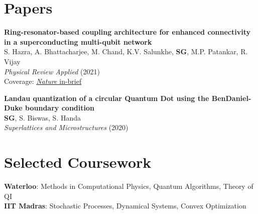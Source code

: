 \documentclass[margin,line]{res}
\begin{document}
\begin{resume}
\section{\sc Papers}
{\bf Ring-resonator-based coupling architecture for enhanced connectivity in a superconducting multi-qubit network} \href{https://journals.aps.org/prapplied/abstract/10.1103/PhysRevApplied.16.024018?ft=1}{\sf[doi]}\\
S. Hazra, A. Bhattacharjee, M. Chand, K.V. Salunkhe, {\bf SG}, M.P. Patankar, R. Vijay\\
\emph{Physical Review Applied} (2021)\\
Coverage: \href{https://www.nature.com/articles/s41578-021-00373-1}{\emph{Nature} \textsf{in-brief}}


{\bf Landau quantization of a circular Quantum Dot using the BenDaniel-Duke boundary condition} \href{https://doi.org/10.1016/j.spmi.2020.106693}{\sf[doi]}\\
{\bf SG}, S. Biswas, S. Handa\\
\emph{Superlattices and Microstructures} (2020)

\section{\sc Selected Coursework}
{\bf Waterloo}: Methods in Computational Physics, Quantum Algorithms, Theory of QI\\
{\bf IIT Madras}: Stochastic Processes, Dynamical Systems, Convex Optimization


\end{resume}
\end{document}
